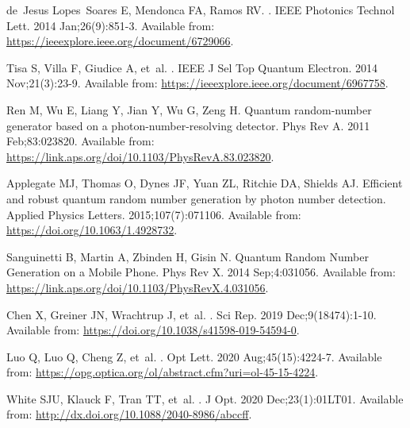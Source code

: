 \documentclass[]{interact}
\theoremstyle{plain}%
\theoremstyle{definition}
\theoremstyle{remark}
\begin{document}
\begin{thebibliography}{100}
de~Jesus Lopes~Soares E, Mendonca FA, Ramos RV.
.
\newblock IEEE Photonics Technol Lett. 2014 Jan;26(9):851-3.
\newblock Available from: \url{https://ieeexplore.ieee.org/document/6729066}.

Tisa S, Villa F, Giudice A, et~al.
.
\newblock IEEE J Sel Top Quantum Electron. 2014 Nov;21(3):23-9.
\newblock Available from: \url{https://ieeexplore.ieee.org/document/6967758}.

Ren M, Wu E, Liang Y, Jian Y, Wu G, Zeng H.
\newblock Quantum random-number generator based on a photon-number-resolving
  detector.
\newblock Phys Rev A. 2011 Feb;83:023820.
\newblock Available from:
  \url{https://link.aps.org/doi/10.1103/PhysRevA.83.023820}.

Applegate MJ, Thomas O, Dynes JF, Yuan ZL, Ritchie DA, Shields AJ.
\newblock Efficient and robust quantum random number generation by photon
  number detection.
\newblock Applied Physics Letters. 2015;107(7):071106.
\newblock Available from: \url{https://doi.org/10.1063/1.4928732}.

Sanguinetti B, Martin A, Zbinden H, Gisin N.
\newblock Quantum Random Number Generation on a Mobile Phone.
\newblock Phys Rev X. 2014 Sep;4:031056.
\newblock Available from:
  \url{https://link.aps.org/doi/10.1103/PhysRevX.4.031056}.

Chen X, Greiner JN, Wrachtrup J, et~al.
.
\newblock Sci Rep. 2019 Dec;9(18474):1-10.
\newblock Available from: \url{https://doi.org/10.1038/s41598-019-54594-0}.

Luo Q, Luo Q, Cheng Z, et~al.
.
\newblock Opt Lett. 2020 Aug;45(15):4224-7.
\newblock Available from:
  \url{https://opg.optica.org/ol/abstract.cfm?uri=ol-45-15-4224}.

White SJU, Klauck F, Tran TT, et~al.
.
\newblock J Opt. 2020 Dec;23(1):01LT01.
\newblock Available from: \url{http://dx.doi.org/10.1088/2040-8986/abccff}.


\end{thebibliography}
\end{document}
